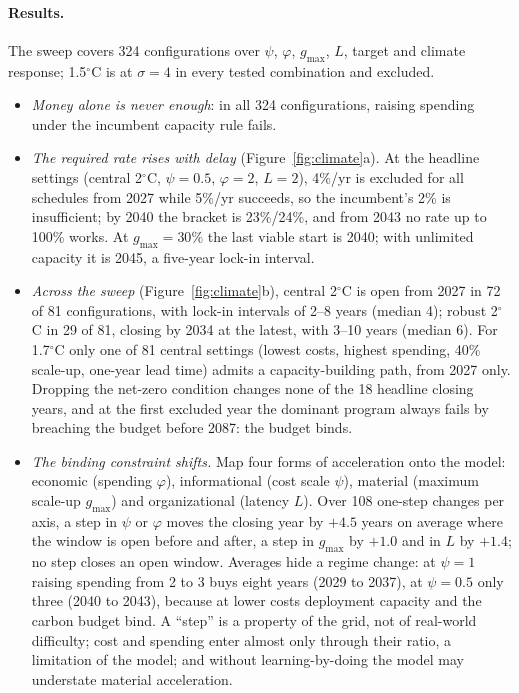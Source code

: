 \documentclass[11pt]{article}
\theoremstyle{plain}
\theoremstyle{definition}
\begin{document}
\paragraph{Results.} The sweep covers 324 configurations over $\psi$, $\varphi$, $g_{\max}$, $L$, target and climate response; 1.5$^\circ$C is at $\sigma=4$ in every tested combination and excluded.
\begin{itemize}
\item \emph{Money alone is never enough}: in all 324 configurations, raising spending under the incumbent capacity rule fails.
\item \emph{The required rate rises with delay} (Figure~\ref{fig:climate}a). At the headline settings (central 2$^\circ$C, $\psi=0.5$, $\varphi=2$, $L=2$), 4\%/yr is excluded for all schedules from 2027 while 5\%/yr succeeds, so the incumbent's 2\% is insufficient; by 2040 the bracket is 23\%/24\%, and from 2043 no rate up to 100\% works. At $g_{\max}=30\%$ the last viable start is 2040; with unlimited capacity it is 2045, a five-year lock-in interval.
\item \emph{Across the sweep} (Figure~\ref{fig:climate}b), central 2$^\circ$C is open from 2027 in 72 of 81 configurations, with lock-in intervals of 2--8 years (median 4); robust 2$^\circ$C in 29 of 81, closing by 2034 at the latest, with 3--10 years (median 6). For 1.7$^\circ$C only one of 81 central settings (lowest costs, highest spending, 40\% scale-up, one-year lead time) admits a capacity-building path, from 2027 only. Dropping the net-zero condition changes none of the 18 headline closing years, and at the first excluded year the dominant program always fails by breaching the budget before 2087: the budget binds.
\item \emph{The binding constraint shifts.} Map four forms of acceleration onto the model: economic (spending $\varphi$), informational (cost scale $\psi$), material (maximum scale-up $g_{\max}$) and organizational (latency $L$). Over 108 one-step changes per axis, a step in $\psi$ or $\varphi$ moves the closing year by $+4.5$ years on average where the window is open before and after, a step in $g_{\max}$ by $+1.0$ and in $L$ by $+1.4$; no step closes an open window. Averages hide a regime change: at $\psi=1$ raising spending from 2 to 3 buys eight years (2029 to 2037), at $\psi=0.5$ only three (2040 to 2043), because at lower costs deployment capacity and the carbon budget bind. A ``step'' is a property of the grid, not of real-world difficulty; cost and spending enter almost only through their ratio, a limitation of the model; and without learning-by-doing the model may understate material acceleration.

\end{itemize}
\end{document}
